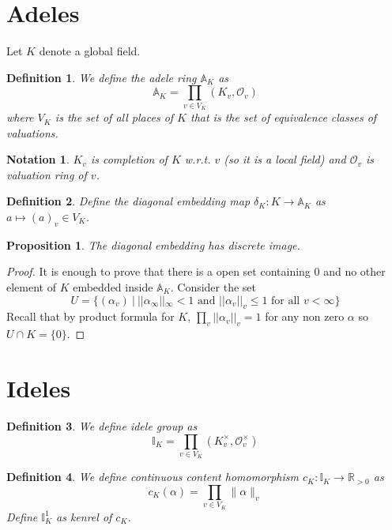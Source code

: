 \documentclass[twoside, 12pt]{iiser-thesis}
\newtheorem{prop}[thm]{ Proposition}
\newtheorem{defi}{ Definition}[section]
\newtheorem{notation}{ Notation}[section]
\newcommand{\R}{\mathbb{R}}
\newcommand{\A}{\mathbb{A}}
\newcommand{\I}{\mathbb{I}}
\newcommand{\Ol}{\mathcal{O}}
\newcommand{\x}{\times}
\begin{document}
\section{Adeles}
Let $K$ denote a global field. 
\begin{defi}
We define the adele ring $\A_K$ as \[ \A _K = \prod _{v \in V_K} (K_v,\mathcal O _v)\]
where $V_K$ is the set of all places of $K$ that is the set of equivalence classes of valuations. 
\end{defi}
\begin{notation}
$K_v$ is completion of $K$ w.r.t. $v$ (so it is a local field) and $\Ol _v$ is valuation ring of $v$. 
\end{notation}
\begin{defi}
Define the diagonal embedding map $\delta _K : K \rightarrow \A _K $ as $a \mapsto (a) _v \in V_K$.
\end{defi}
\begin{prop}
The diagonal embedding has discrete image.
\end{prop}
\begin{proof} It is enough to prove that there is a open set containing $0$ and no other element of $K$ embedded inside $\A _K$.
Consider the set \[ U =  \{ (\alpha _v) \  | \ ||\alpha _\infty|| _\infty <1 \text{ and } || \alpha  _v|| _v \leq 1 \text{ for all } v < \infty \} \] 
Recall that by product formula for $K$, $ \prod _{v} ||\alpha _v || _v =1$ for any non zero $\alpha $ so $U \cap K = \{ 0 \}$.  
\end{proof}
\section{Ideles}
\begin{defi}
We define idele group as \[ \I _K = \prod _{v\in V_K} (K^\x _v , \Ol ^ \x _v)\]
\end{defi}
\begin{defi}
We define continuous content homomorphism $c_K : \I _K \rightarrow \R _{>0}$ as \[c_K (\alpha ) = \prod _{v \in V_K} \| \alpha \| _v\]
Define $\I ^1 _K$ as kenrel of $c_K$.
\end{defi}
\end{document}
